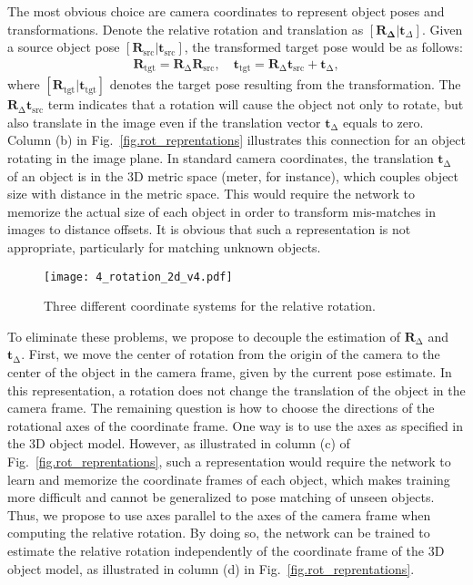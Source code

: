 \documentclass[twocolumn]{svjour3}
\begin{document}
The most obvious choice are camera coordinates to represent object poses and transformations. Denote the relative rotation and translation as $[\mathbf{R_\Delta}|\mathbf{t}_\Delta]$. Given a source object pose $[\mathbf{R}_{\text{src}}|\mathbf{t}_{\text{src}}]$, the transformed target pose would be as follows:
\begin{equation}
\begin{split}
\mathbf{R}_\text{tgt} = \mathbf{R}_\mathrm{\Delta} \mathbf{R}_\text{src}, \quad
\mathbf{t}_\text{tgt} = \mathbf{R}_\mathrm{\Delta} \mathbf{t}_\text{src}+\mathbf{t}_\mathrm{\Delta},
\end{split}
\label{eq.naive_transform}
\end{equation}
where $[\mathbf{R}_{\text{tgt}}|\mathbf{t}_{\text{tgt}}]$ denotes the target pose resulting from the transformation.
The $\mathbf{R}_\mathrm{\Delta} \mathbf{t}_\text{src}$ term indicates that a rotation will cause the object not only to rotate, but also translate in the image even if the translation vector $\mathbf{t}_\mathrm{\Delta}$ equals to zero. 
Column (b) in Fig.~\ref{fig.rot_reprentations} illustrates this connection for an object rotating in the image plane.  
In standard camera coordinates, the translation $\mathbf{t}_\mathrm{\Delta}$ of an object is in the 3D metric space (meter, for instance), which couples object size with distance in the metric space.  This would require the network to memorize the actual size of each object in order to transform mis-matches in images to distance offsets. It is obvious that such a representation is not appropriate, particularly for matching unknown objects. 
\begin{figure*}[t]
	\centering
	\texttt{[image: 4\_rotation\_2d\_v4.pdf]}
\caption{Three different coordinate systems for the relative rotation.}%
\label{fig.different_reprentation}
\end{figure*}
\fi

To eliminate these problems, we propose to decouple the estimation of $\mathbf{R}_\mathrm{\Delta}$ and $\mathbf{t}_\mathrm{\Delta}$. First, we move the center of rotation from the origin of the camera to the center of the object in the camera frame, given by the current pose estimate. In this representation, a rotation does not change the translation of the object in the camera frame. The remaining question is how to choose the directions of the rotational axes of the coordinate frame. One way is to use the axes as specified in the 3D object model. However, as illustrated in column (c) of Fig.~\ref{fig.rot_reprentations}, such a representation would require the network to learn and memorize the coordinate frames of each object, which makes  training more difficult and cannot be generalized to pose matching of unseen objects.  Thus, we propose to use axes parallel to the axes of the camera frame when computing the relative rotation. By doing so, the network can be trained to estimate the relative rotation independently of the coordinate frame of the 3D object model, as illustrated in column (d) in Fig.~\ref{fig.rot_reprentations}. 
\end{document}
